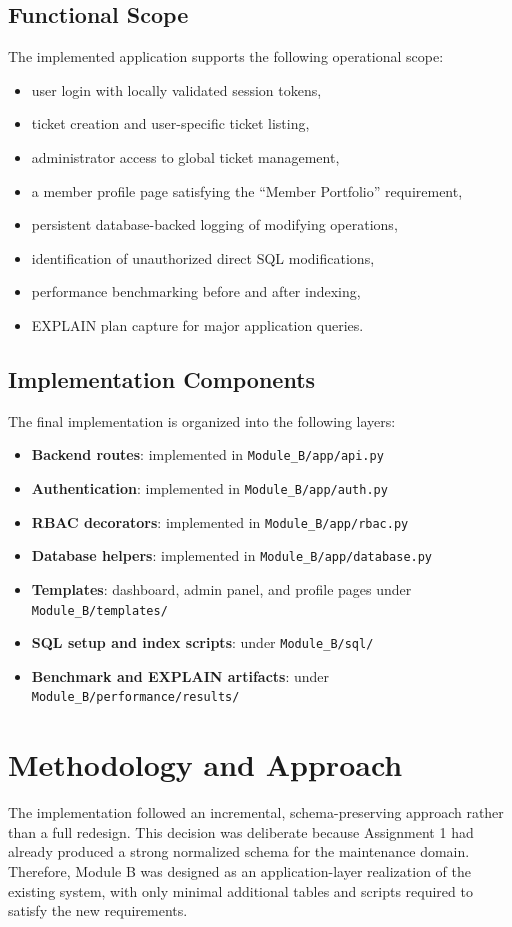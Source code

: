 \documentclass[12pt,a4paper]{article}
\begin{document}
\subsection{Functional Scope}
The implemented application supports the following operational scope:
\begin{itemize}[leftmargin=1.5em]
    \item user login with locally validated session tokens,
    \item ticket creation and user-specific ticket listing,
    \item administrator access to global ticket management,
    \item a member profile page satisfying the ``Member Portfolio'' requirement,
    \item persistent database-backed logging of modifying operations,
    \item identification of unauthorized direct SQL modifications,
    \item performance benchmarking before and after indexing,
    \item EXPLAIN plan capture for major application queries.
\end{itemize}

\subsection{Implementation Components}
The final implementation is organized into the following layers:
\begin{itemize}[leftmargin=1.5em]
    \item \textbf{Backend routes}: implemented in \texttt{Module\_B/app/api.py}
    \item \textbf{Authentication}: implemented in \texttt{Module\_B/app/auth.py}
    \item \textbf{RBAC decorators}: implemented in \texttt{Module\_B/app/rbac.py}
    \item \textbf{Database helpers}: implemented in \texttt{Module\_B/app/database.py}
    \item \textbf{Templates}: dashboard, admin panel, and profile pages under \texttt{Module\_B/templates/}
    \item \textbf{SQL setup and index scripts}: under \texttt{Module\_B/sql/}
    \item \textbf{Benchmark and EXPLAIN artifacts}: under \texttt{Module\_B/performance/results/}
\end{itemize}

\section{Methodology and Approach}
The implementation followed an incremental, schema-preserving approach rather than a full redesign. This decision was deliberate because Assignment 1 had already produced a strong normalized schema for the maintenance domain. Therefore, Module B was designed as an application-layer realization of the existing system, with only minimal additional tables and scripts required to satisfy the new requirements.
\end{document}
